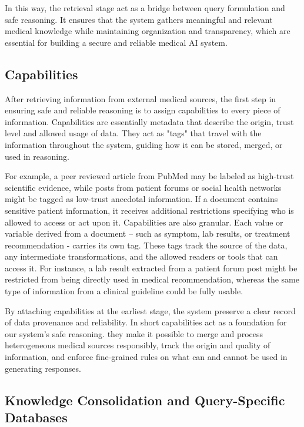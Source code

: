 \documentclass[conference, anonymous]{IEEEtran}
\begin{document}
In this way, the retrieval stage act as a bridge between query formulation and safe reasoning. It ensures that the system gathers meaningful and relevant medical knowledge while maintaining organization and transparency, which are essential for building a secure and reliable medical AI system.

\subsection{Capabilities}
\label{subsec: capabilities}

After retrieving information from external medical sources, the first step in ensuring safe and reliable reasoning is to assign capabilities to every piece of information. Capabilities are essentially metadata that describe the origin, trust level and allowed usage of data. They act as "tags" that travel with the information throughout the system, guiding how it can be stored, merged, or used in reasoning.

For example, a peer reviewed article from PubMed may be labeled as high-trust scientific evidence, while posts from patient forums or social health networks might be tagged as low-trust anecdotal information. If a document contains sensitive patient  information, it receives additional restrictions specifying who is allowed to access or act upon it.  Capabilities are also granular. Each value or variable derived from a document -- such as symptom, lab results, or treatment recommendation - carries its own tag. These tags track the source of the data, any intermediate transformations, and the allowed readers or tools that can access it. For instance, a lab result extracted from a patient forum post might be restricted from being directly used in medical recommendation, whereas the same type of information from a clinical guideline could be fully usable.

By attaching capabilities at the earliest stage, the system preserve a clear record of data provenance and reliability. In short capabilities act as a foundation for our system's safe reasoning. they make it possible to merge and process heterogeneous medical sources responsibly, track the origin and quality of information, and enforce fine-grained rules on what can and cannot be used in generating responses. 

\subsection{Knowledge Consolidation and Query-Specific Databases}
\label{subsec: query-specificd-databases}
\end{document}
